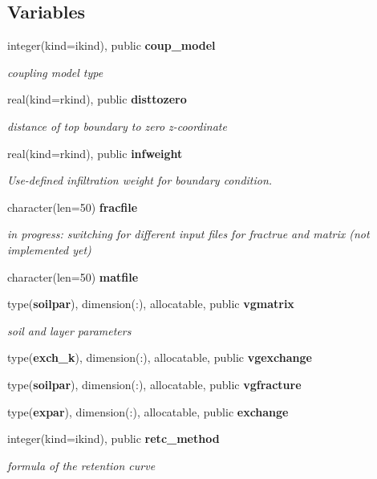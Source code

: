 \subsection*{Variables}
\begin{DoxyCompactItemize}
\item 
integer(kind=ikind), public {\bf coup\+\_\+model}
\begin{DoxyCompactList}\small\item\em coupling model type \end{DoxyCompactList}\item 
real(kind=rkind), public {\bf disttozero}
\begin{DoxyCompactList}\small\item\em distance of top boundary to zero z-\/coordinate \end{DoxyCompactList}\item 
real(kind=rkind), public {\bf infweight}
\begin{DoxyCompactList}\small\item\em Use-\/defined infiltration weight for boundary condition. \end{DoxyCompactList}\item 
character(len=50) {\bf fracfile}
\begin{DoxyCompactList}\small\item\em in progress\+: switching for different input files for fractrue and matrix (not implemented yet) \end{DoxyCompactList}\item 
character(len=50) {\bf matfile}
\item 
type({\bf soilpar}), dimension(\+:), allocatable, public {\bf vgmatrix}
\begin{DoxyCompactList}\small\item\em soil and layer parameters \end{DoxyCompactList}\item 
type({\bf exch\+\_\+k}), dimension(\+:), allocatable, public {\bf vgexchange}
\item 
type({\bf soilpar}), dimension(\+:), allocatable, public {\bf vgfracture}
\item 
type({\bf expar}), dimension(\+:), allocatable, public {\bf exchange}
\item 
integer(kind=ikind), public {\bf retc\+\_\+method}
\begin{DoxyCompactList}\small\item\em formula of the retention curve \end{DoxyCompactList}\end{DoxyCompactItemize}


